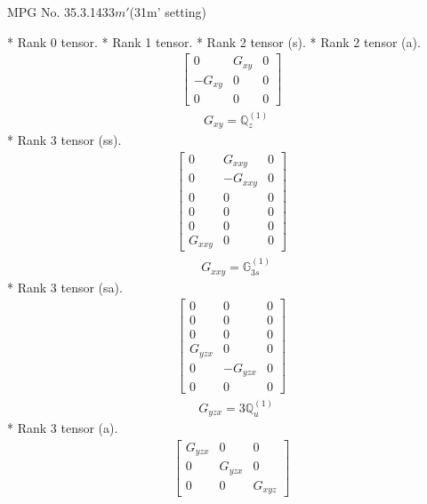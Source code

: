 \documentclass[fleqn,8pt,landscape]{jsarticle}
\begin{document}
\setcounter{MaxMatrixCols}{32}

\renewcommand{\tablename}{Table~}
\renewcommand{\figurename}{Figure~}
\begin{center}
\LARGE
MPG No. 35.3.143\quad$3m'$\quad(31m' setting)
\end{center}
* Rank 0 tensor.
* Rank 1 tensor.
* Rank 2 tensor (s).
* Rank 2 tensor (a).
\begin{align*}
\begin{bmatrix} 0 & G_{xy} & 0 \\ - G_{xy} & 0 & 0 \\ 0 & 0 & 0 \end{bmatrix}
\end{align*}
\begin{align*}
& G_{xy} = \mathbb{Q}_{z}^{(1)}
\end{align*}
* Rank 3 tensor (ss).
\begin{align*}
\begin{bmatrix} 0 & G_{xxy} & 0 \\ 0 & - G_{xxy} & 0 \\ 0 & 0 & 0 \\ 0 & 0 & 0 \\ 0 & 0 & 0 \\ G_{xxy} & 0 & 0 \end{bmatrix}
\end{align*}
\begin{align*}
& G_{xxy} = \mathbb{G}_{3s}^{(1)}
\end{align*}
* Rank 3 tensor (sa).
\begin{align*}
\begin{bmatrix} 0 & 0 & 0 \\ 0 & 0 & 0 \\ 0 & 0 & 0 \\ G_{yzx} & 0 & 0 \\ 0 & - G_{yzx} & 0 \\ 0 & 0 & 0 \end{bmatrix}
\end{align*}
\begin{align*}
& G_{yzx} = 3 \mathbb{Q}_{u}^{(1)}
\end{align*}
* Rank 3 tensor (a).
\begin{align*}
\begin{bmatrix} G_{yzx} & 0 & 0 \\ 0 & G_{yzx} & 0 \\ 0 & 0 & G_{xyz} \end{bmatrix}
\end{align*}
\end{document}
